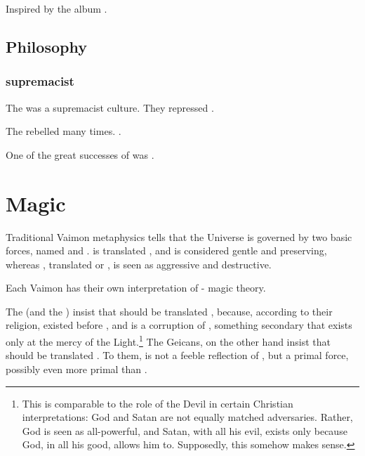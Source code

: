 Inspired by the album .









\subsection{Philosophy}





\subsubsection{\Human supremacist}
The \VaimonCaliphate was a \human supremacist culture. 
They repressed \scathae. 

The \scathae rebelled many times. 
. 

One of the great successes of \ClanTelcra was . 















\section{Magic}
Traditional Vaimon metaphysics tells that the Universe is governed by two basic forces, named \Iquin{} and \Itzach. \Iquin{} is translated , and is considered gentle and preserving, whereas \Itzach{}, translated  or , is seen as aggressive and destructive. 

Each Vaimon \vclan has their own interpretation of \Iquin{}-\Itzach{} magic theory. 

The  (and the ) insist that \Itzach{} should be translated , because, according to their religion, \Iquin{} existed before \Itzach{}, and \Itzach{} is a corruption of \Iquin{}, something secondary that exists only at the mercy of the Light.\footnote{This is comparable to the role of the Devil in certain Christian interpretations: God and Satan are not equally matched adversaries. Rather, God is seen as all-powerful, and Satan, with all his evil, exists only because God, in all his good, allows him to. Supposedly, this somehow makes sense.} The Geicans, on the other hand insist that \Itzach{} should be translated . To them, \Itzach{} is not a feeble reflection of \Iquin{}, but a primal force, possibly even more primal than \Iquin{}. 





